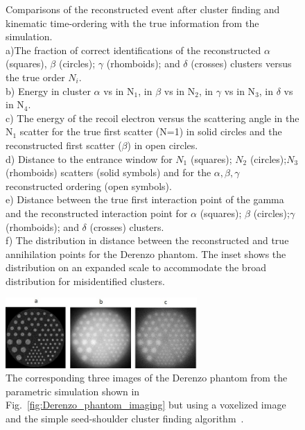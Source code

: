 \documentclass[12pt]{article}
\begin{document}
\begin{figure}[p]
\caption{Comparisons of the reconstructed event after cluster finding and kinematic time-ordering with the true information from the simulation.\\
a)The fraction of correct identifications of the reconstructed $\alpha$ (squares), $\beta$  (circles); $\gamma$ (rhomboids); and $\delta$ (crosses) clusters versus the true order $N_i$.\\
b) Energy in cluster $\alpha$ vs in N$_1$, in $\beta$ vs in N$_2$, in $\gamma$ vs in N$_3$, in $\delta$ vs in N$_4$.\\
c) The energy of the recoil electron versus the scattering angle in the
                N$_1$ scatter for the true first scatter (N=1) in solid circles and the reconstructed first scatter ($\beta$) in open circles.\\
d) Distance to the entrance window for $N_1$ (squares);
                $N_2$ (circles);$N_3$ (rhomboids) scatters (solid symbols) and for the $\alpha,\beta,\gamma$ reconstructed ordering (open symbols).\\
e) Distance between the true first interaction point of the gamma and the reconstructed interaction point for $\alpha$ (squares);
                $\beta$ (circles);$\gamma$ (rhomboids); and $\delta $ (crosses) clusters.\\
f) The distribution in distance between the reconstructed and true annihilation points for the Derenzo phantom. The inset shows the distribution on an expanded scale to accommodate  the broad distribution for misidentified clusters. }
\label{fig:cluster_finding}
\end{figure}


\begin{figure}[!ht]
\centering
\includegraphics[angle=0,width=0.65\textwidth]{Figures/ZernikeFitDerenzoMOCK_crop_v1a.jpg}
\caption{The corresponding three images of the Derenzo phantom from the parametric simulation shown in Fig.~\ref{fig:Derenzo_phantom_imaging} but using a voxelized image and the simple seed-shoulder cluster finding algorithm~\cite{Amidei_CDF_trigger_1988,PET_NIM_paper}.}
\label{fig:CF_Derenzo_phantom_imaging}
\end{figure}
\end{document}
